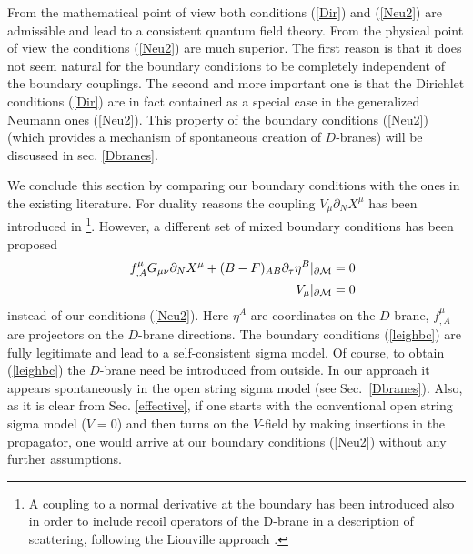 \documentclass[a4paper,12pt]{article}
\newcommand{\oB}{|_{\partial{\cal M}}}
\begin{document}
{}From the mathematical point of view both conditions
(\ref{Dir}) and (\ref{Neu2}) are admissible and lead
to a consistent quantum field theory. From the physical
point of view the conditions (\ref{Neu2}) are much
superior. The first reason is that it does not seem natural
for the boundary conditions to be completely independent
of the boundary couplings. The second and  more
important one is that the  Dirichlet conditions
(\ref{Dir}) are in fact contained as a special case in the 
generalized Neumann ones 
(\ref{Neu2}). This property of the boundary conditions
(\ref{Neu2}) (which provides a mechanism of spontaneous creation
of $D$-branes) will be discussed in sec. \ref{Dbranes}.

We conclude this section by comparing our boundary conditions
with the ones in the existing literature. 
For duality reasons the coupling $V_\mu\partial_N X^\mu$
has been introduced in \cite{DLP89,Leigh89}\footnote{
A coupling to a normal derivative at the boundary has been
introduced also in order to include recoil operators of the D-brane
in a description of scattering, following the Liouville approach 
\cite{Ellis97,Mavromatos99,Ellis98}.}. However,
a different set of mixed boundary conditions has been
proposed \cite{Leigh89}
\begin{eqnarray}
&&f^\mu_{,A}G_{\mu\nu}\partial_NX^\mu +(B-F)_{AB}\partial_\tau \eta^B 
\oB =0 \nonumber \\
&&V_\mu \oB =0 \label{leighbc}
\end{eqnarray}
instead of our conditions (\ref{Neu2}). Here $\eta^A$ are coordinates
on the $D$-brane, $f^\mu_{,A}$ are projectors on the $D$-brane
directions. The boundary conditions (\ref{leighbc}) are fully
legitimate and lead to a self-consistent sigma model. Of course,
to obtain (\ref{leighbc}) the $D$-brane need be introduced 
from outside.
In our approach it appears spontaneously in the open string sigma
model (see Sec.\ \ref{Dbranes}). Also, as it is clear from 
Sec. \ref{effective}, if one starts with the conventional
open string sigma model ($V=0$) and then turns on the $V$-field
by making insertions in the propagator, one would arrive at
our boundary conditions (\ref{Neu2}) without any further assumptions.
\end{document}
